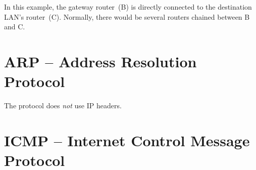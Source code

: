\begin{remark}
In this example, the gateway router~(B) is directly connected to the destination LAN's router~(C).
Normally, there would be several routers chained between B and C.
\end{remark}







% 
% 

\section{ARP -- Address Resolution Protocol}
\begin{remark}
The  protocol does \textit{not} use IP headers.
\end{remark}

\section{ICMP -- Internet Control Message Protocol}


